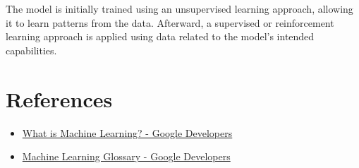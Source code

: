 \documentclass[a4paper,12pt]{article}
\begin{document}
The model is initially trained using an unsupervised learning approach, allowing it to learn patterns from the data. Afterward, a supervised or reinforcement learning approach is applied using data related to the model's intended capabilities.

\section{References}
\begin{itemize}
    \item \href{https://developers.google.com/machine-learning/intro-to-ml/what-is-ml}{What is Machine Learning? - Google Developers}
    \item \href{https://developers.google.com/machine-learning/glossary}{Machine Learning Glossary - Google Developers}
\end{itemize}
\end{document}
